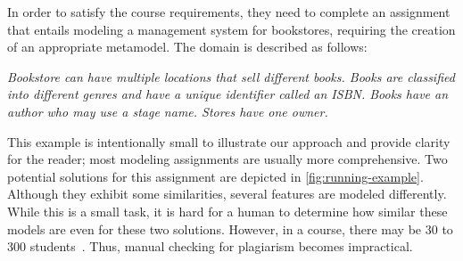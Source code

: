 In order to satisfy the course requirements, they need to complete an assignment that entails modeling a management system for bookstores, requiring the creation of an appropriate metamodel.
The domain is described as follows:
\begin{myquote}
\small
\textit{Bookstore can have multiple locations that sell different books.
Books are classified into different genres and have a unique identifier called an ISBN.
Books have an author who may use a stage name. Stores have one owner.  }
\end{myquote}
This example is intentionally small to illustrate our approach and provide clarity for the reader; most modeling assignments are usually more comprehensive.
Two potential solutions for this assignment are depicted in \autoref{fig:running-example}.
Although they exhibit some similarities, several features are modeled differently.
While this is a small task, it is hard for a human to determine how similar these models are even for these two solutions.
However, in a course, there may be 30 to 300 students~\cite{Ciccozzi2018}. Thus, manual checking for plagiarism becomes impractical.

